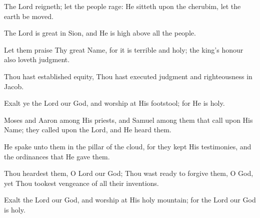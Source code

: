 The Lord reigneth; let the people rage: He sitteth upon the cherubim, let the earth be moved.

The Lord is great in Sion, and He is high above all the people.

Let them praise Thy great Name, for it is terrible and holy; the king's honour also loveth judgment.

Thou hast established equity, Thou hast executed judgment and righteousness in Jacob.

Exalt ye the Lord our God, and worship at His footstool; for He is holy.

Moses and Aaron among His priests, and Samuel among them that call upon His Name; they called upon the Lord, and He heard them.

He spake unto them in the pillar of the cloud, for they kept His testimonies, and the ordinances that He gave them.

Thou heardest them, O Lord our God; Thou wast ready to forgive them, O God, yet Thou tookest vengeance of all their inventions.

Exalt the Lord our God, and worship at His holy mountain; for the Lord our God is holy.
